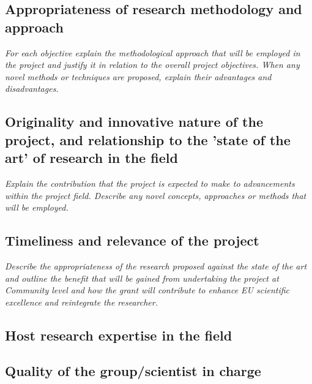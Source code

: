 \documentclass[a4paper,11pt]{article}
\newenvironment{xcomment}{\em}{}
\begin{document}
\subsection{Appropriateness of research methodology and approach}

\begin{xcomment}
For each objective explain the methodological approach that will be
employed in the project and justify it in relation to the overall
project objectives. When any novel methods or techniques are proposed,
explain their advantages and disadvantages.
\end{xcomment}

\subsection{Originality and innovative nature of the project, and relationship to the 'state of the art' of research in the field}

\begin{xcomment}
Explain the contribution that the project is expected to make to
advancements within the project field. Describe any novel concepts,
approaches or methods that will be employed.
\end{xcomment}

\subsection{Timeliness and relevance of the project}

\begin{xcomment}
Describe the appropriateness of the research proposed against the
state of the art and outline the benefit that will be gained from
undertaking the project at Community level and how the grant will
contribute to enhance EU scientific excellence and reintegrate the
researcher.
\end{xcomment}

\subsection{Host research expertise in the field}

\subsection{Quality of the group/scientist in charge}
\end{document}
